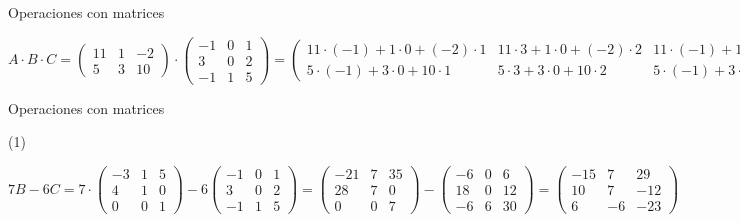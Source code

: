 \documentclass[8pt]{beamer}
\begin{document}
\begin{frame}[t]{Operaciones con matrices}
\begin{tasks}[label=\alph*)]
{$A\cdot B \cdot C = \begin{pmatrix}
11 & 1 & -2 \\ 5 & 3 & 10
\end{pmatrix} \cdot \begin{pmatrix}
-1 & 0 & 1 \\ 3 & 0 & 2 \\ -1 & 1 & 5
\end{pmatrix} = \begin{pmatrix}
11 \cdot (-1) +1\cdot 0 + (-2) \cdot 1  & 11\cdot 3 +1\cdot 0 + (-2) \cdot 2 & 11\cdot (-1) +1\cdot 1 + (-2) \cdot 5 \\
 5\cdot (-1) +3\cdot 0 + 10 \cdot 1 & 5 \cdot 3 +3\cdot 0 + 10 \cdot 2 & 5 \cdot (-1) +3\cdot 1 + 10 \cdot 5
\end{pmatrix} = \begin{pmatrix}
-6 & -2 & 3 \\ -6 & 10 & 61
\end{pmatrix} $

}


\end{tasks}

\end{frame}

\begin{frame}[t]{Operaciones con matrices}
\begin{tasks}[label=\alph*),resume](1)
\task {}
\task {}

{$7B-6C = 7 \cdot \begin{pmatrix}
-3 & 1 & 5 \\ 4 & 1 & 0 \\ 0 & 0 & 1
\end{pmatrix} - 6\begin{pmatrix}
-1 & 0 & 1 \\ 3 & 0 & 2 \\ -1 & 1 & 5
 \end{pmatrix} = \begin{pmatrix}
-21 & 7 & 35 \\ 28 & 7 & 0 \\ 0 & 0 & 7
\end{pmatrix} - \begin{pmatrix}
-6 & 0 & 6 \\ 18 & 0 & 12 \\ -6 & 6 & 30
 \end{pmatrix}= \begin{pmatrix}
-15 & 7 & 29 \\ 10 & 7 & -12 \\ 6 & -6 & -23
 \end{pmatrix}$
}
\end{tasks}

\end{frame}
\end{document}
